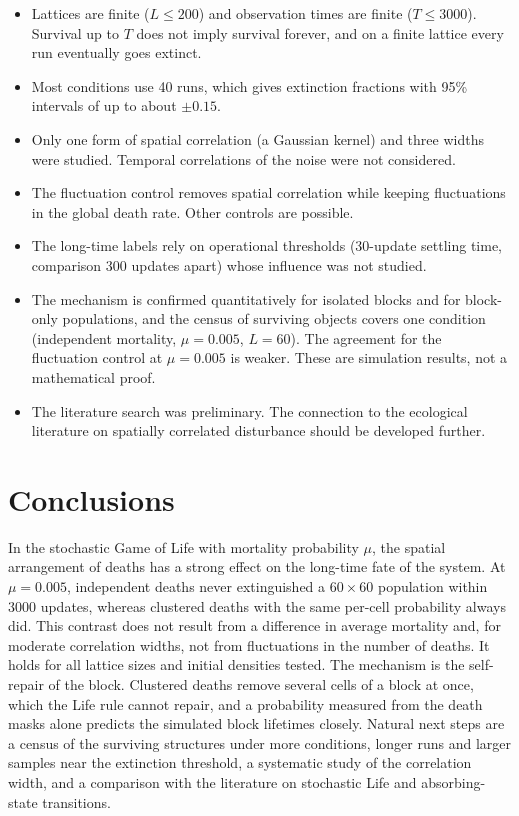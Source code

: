 \documentclass[11pt,a4paper]{article}
\begin{document}
\begin{itemize}
\item Lattices are finite ($L\le200$) and observation times are finite ($T\le3000$). Survival up to $T$ does not imply survival forever, and on a finite lattice every run eventually goes extinct.
\item Most conditions use 40 runs, which gives extinction fractions with 95\% intervals of up to about $\pm0.15$.
\item Only one form of spatial correlation (a Gaussian kernel) and three widths were studied. Temporal correlations of the noise were not considered.
\item The fluctuation control removes spatial correlation while keeping fluctuations in the global death rate. Other controls are possible.
\item The long-time labels rely on operational thresholds (30-update settling time, comparison 300 updates apart) whose influence was not studied.
\item The mechanism is confirmed quantitatively for isolated blocks and for block-only populations, and the census of surviving objects covers one condition (independent mortality, $\mu=0.005$, $L=60$). The agreement for the fluctuation control at $\mu=0.005$ is weaker. These are simulation results, not a mathematical proof.
\item The literature search was preliminary. The connection to the ecological literature on spatially correlated disturbance should be developed further.
\end{itemize}

\section{Conclusions}

In the stochastic Game of Life with mortality probability $\mu$, the spatial arrangement of deaths has a strong effect on the long-time fate of the system. At $\mu=0.005$, independent deaths never extinguished a $60\times60$ population within 3000 updates, whereas clustered deaths with the same per-cell probability always did. This contrast does not result from a difference in average mortality and, for moderate correlation widths, not from fluctuations in the number of deaths. It holds for all lattice sizes and initial densities tested. The mechanism is the self-repair of the block. Clustered deaths remove several cells of a block at once, which the Life rule cannot repair, and a probability measured from the death masks alone predicts the simulated block lifetimes closely. Natural next steps are a census of the surviving structures under more conditions, longer runs and larger samples near the extinction threshold, a systematic study of the correlation width, and a comparison with the literature on stochastic Life and absorbing-state transitions.
\end{document}
